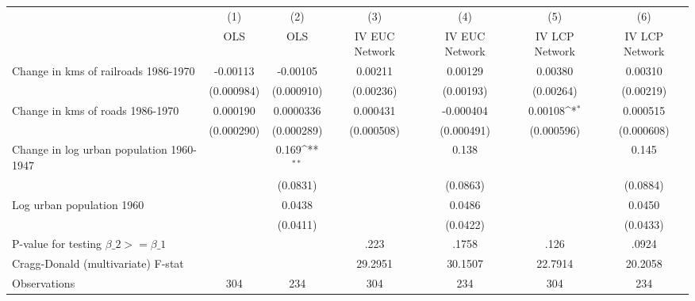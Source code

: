 {
\def\sym#1{\ifmmode^{#1}\else\(^{#1}\)\fi}
\begin{tabular}{l*{6}{c}}
\hline\hline
                &\multicolumn{1}{c}{(1)}&\multicolumn{1}{c}{(2)}&\multicolumn{1}{c}{(3)}&\multicolumn{1}{c}{(4)}&\multicolumn{1}{c}{(5)}&\multicolumn{1}{c}{(6)}\\
                &\multicolumn{1}{c}{OLS}&\multicolumn{1}{c}{OLS}&\multicolumn{1}{c}{IV EUC Network}&\multicolumn{1}{c}{IV EUC Network}&\multicolumn{1}{c}{IV LCP Network}&\multicolumn{1}{c}{IV LCP Network}\\
\hline
Change in kms of railroads 1986-1970& -0.00113         & -0.00105         &  0.00211         &  0.00129         &  0.00380         &  0.00310         \\
                &(0.000984)         &(0.000910)         &(0.00236)         &(0.00193)         &(0.00264)         &(0.00219)         \\
[1em]
Change in kms of roads 1986-1970& 0.000190         &0.0000336         & 0.000431         &-0.000404         &  0.00108\sym{*}  & 0.000515         \\
                &(0.000290)         &(0.000289)         &(0.000508)         &(0.000491)         &(0.000596)         &(0.000608)         \\
[1em]
Change in log urban population 1960-1947&                  &    0.169\sym{**} &                  &    0.138         &                  &    0.145         \\
                &                  & (0.0831)         &                  & (0.0863)         &                  & (0.0884)         \\
[1em]
Log urban population 1960&                  &   0.0438         &                  &   0.0486         &                  &   0.0450         \\
                &                  & (0.0411)         &                  & (0.0422)         &                  & (0.0433)         \\
\hline
P-value for testing $\beta\_{2} >= \beta\_{1}$&                  &                  &     .223         &    .1758         &     .126         &    .0924         \\
Cragg-Donald (multivariate) F-stat&                  &                  &  29.2951         &  30.1507         &  22.7914         &  20.2058         \\
Observations    &      304         &      234         &      304         &      234         &      304         &      234         \\
\hline\hline
\end{tabular}
}
